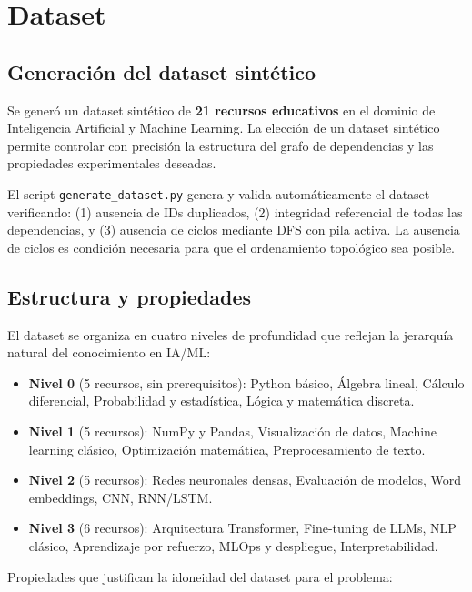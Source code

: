 \documentclass[11pt, a4paper]{article}
\begin{document}
\section{Dataset}

\subsection{Generación del dataset sintético}

Se generó un dataset sintético de \textbf{21 recursos educativos} en el dominio de Inteligencia Artificial y Machine Learning. La elección de un dataset sintético permite controlar con precisión la estructura del grafo de dependencias y las propiedades experimentales deseadas.

El script \texttt{generate\_dataset.py} genera y valida automáticamente el dataset verificando: (1) ausencia de IDs duplicados, (2) integridad referencial de todas las dependencias, y (3) ausencia de ciclos mediante DFS con pila activa. La ausencia de ciclos es condición necesaria para que el ordenamiento topológico sea posible.

\subsection{Estructura y propiedades}

El dataset se organiza en cuatro niveles de profundidad que reflejan la jerarquía natural del conocimiento en IA/ML:

\begin{itemize}[leftmargin=1.5em]
  \item \textbf{Nivel 0} (5 recursos, sin prerequisitos): Python básico, Álgebra lineal, Cálculo diferencial, Probabilidad y estadística, Lógica y matemática discreta.
  \item \textbf{Nivel 1} (5 recursos): NumPy y Pandas, Visualización de datos, Machine learning clásico, Optimización matemática, Preprocesamiento de texto.
  \item \textbf{Nivel 2} (5 recursos): Redes neuronales densas, Evaluación de modelos, Word embeddings, CNN, RNN/LSTM.
  \item \textbf{Nivel 3} (6 recursos): Arquitectura Transformer, Fine-tuning de LLMs, NLP clásico, Aprendizaje por refuerzo, MLOps y despliegue, Interpretabilidad.
\end{itemize}

Propiedades que justifican la idoneidad del dataset para el problema:
\end{document}
